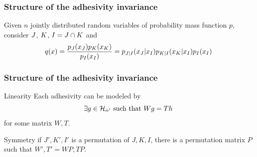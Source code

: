 \documentclass[10pt,svgnames,usenames,table]{beamer}
\begin{document}
  \begin{frame}
    \frametitle{Structure of the adhesivity invariance}
    Given $n$ jointly distributed random variables of probability mass function $p$,
    consider $\Jis$, $\Kis$, $\Iis = \Jis \cap \Kis$ and
    \[ q(x) = \frac{p_{\Jis}(x_{\Jis})p_{\Kis}(x_{\Kis})}{p_{\Iis}(x_{\Iis})} = p_{\Jis|\Iis}(x_{\Jis}|x_{\Iis})p_{\Kis|\Iis}(x_{\Kis}|x_{\Iis})p_{\Iis}(x_{\Iis}) \]
  \end{frame}

  \begin{frame}
    \frametitle{Structure of the adhesivity invariance}
    \begin{block}{Linearity}
      Each adhesivity can be modeled by
      \[ \exists g \in \Ec[n'] \text{ such that } Wg = Th \]
      for some matrix $W,T$.
    \end{block}

    \begin{block}{Symmetry}
      if $J', K', I'$ is a permutation of $J, K, I$,
      there is a permutation matrix $P$ such that $W', T' = WP, TP$.
    \end{block}
  \end{frame}
\end{document}
